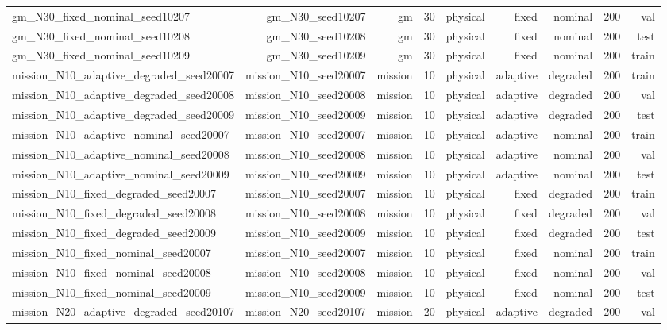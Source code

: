 \begin{tabular}{lrrrrrrrr}
gm\_N30\_fixed\_nominal\_seed10207 & gm\_N30\_seed10207 & gm & 30 & physical & fixed & nominal & 200 & val \\
gm\_N30\_fixed\_nominal\_seed10208 & gm\_N30\_seed10208 & gm & 30 & physical & fixed & nominal & 200 & test \\
gm\_N30\_fixed\_nominal\_seed10209 & gm\_N30\_seed10209 & gm & 30 & physical & fixed & nominal & 200 & train \\
mission\_N10\_adaptive\_degraded\_seed20007 & mission\_N10\_seed20007 & mission & 10 & physical & adaptive & degraded & 200 & train \\
mission\_N10\_adaptive\_degraded\_seed20008 & mission\_N10\_seed20008 & mission & 10 & physical & adaptive & degraded & 200 & val \\
mission\_N10\_adaptive\_degraded\_seed20009 & mission\_N10\_seed20009 & mission & 10 & physical & adaptive & degraded & 200 & test \\
mission\_N10\_adaptive\_nominal\_seed20007 & mission\_N10\_seed20007 & mission & 10 & physical & adaptive & nominal & 200 & train \\
mission\_N10\_adaptive\_nominal\_seed20008 & mission\_N10\_seed20008 & mission & 10 & physical & adaptive & nominal & 200 & val \\
mission\_N10\_adaptive\_nominal\_seed20009 & mission\_N10\_seed20009 & mission & 10 & physical & adaptive & nominal & 200 & test \\
mission\_N10\_fixed\_degraded\_seed20007 & mission\_N10\_seed20007 & mission & 10 & physical & fixed & degraded & 200 & train \\
mission\_N10\_fixed\_degraded\_seed20008 & mission\_N10\_seed20008 & mission & 10 & physical & fixed & degraded & 200 & val \\
mission\_N10\_fixed\_degraded\_seed20009 & mission\_N10\_seed20009 & mission & 10 & physical & fixed & degraded & 200 & test \\
mission\_N10\_fixed\_nominal\_seed20007 & mission\_N10\_seed20007 & mission & 10 & physical & fixed & nominal & 200 & train \\
mission\_N10\_fixed\_nominal\_seed20008 & mission\_N10\_seed20008 & mission & 10 & physical & fixed & nominal & 200 & val \\
mission\_N10\_fixed\_nominal\_seed20009 & mission\_N10\_seed20009 & mission & 10 & physical & fixed & nominal & 200 & test \\
mission\_N20\_adaptive\_degraded\_seed20107 & mission\_N20\_seed20107 & mission & 20 & physical & adaptive & degraded & 200 & val \\

\end{tabular}
